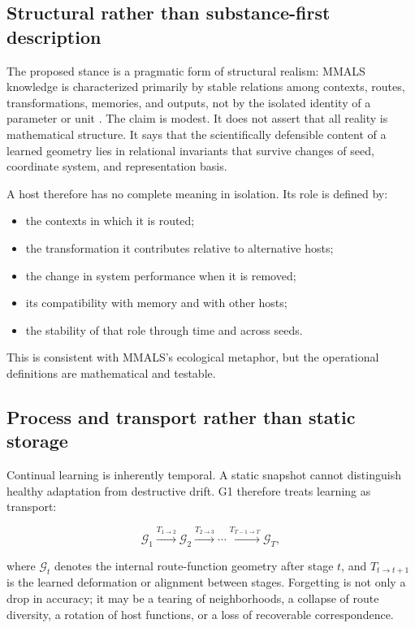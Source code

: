 \documentclass[11pt,a4paper]{article}
\begin{document}
\subsection{Structural rather than substance-first description}

The proposed stance is a pragmatic form of structural realism: MMALS knowledge is characterized primarily by stable relations among contexts, routes, transformations, memories, and outputs, not by the isolated identity of a parameter or unit \citep{worrall1989structural}. The claim is modest. It does not assert that all reality is mathematical structure. It says that the scientifically defensible content of a learned geometry lies in relational invariants that survive changes of seed, coordinate system, and representation basis.

A host therefore has no complete meaning in isolation. Its role is defined by:

\begin{itemize}
\item the contexts in which it is routed;
\item the transformation it contributes relative to alternative hosts;
\item the change in system performance when it is removed;
\item its compatibility with memory and with other hosts;
\item the stability of that role through time and across seeds.
\end{itemize}

This is consistent with MMALS's ecological metaphor, but the operational definitions are mathematical and testable.

\subsection{Process and transport rather than static storage}

Continual learning is inherently temporal. A static snapshot cannot distinguish healthy adaptation from destructive drift. G1 therefore treats learning as transport:

\begin{equation}
\mathcal{G}_1 \xrightarrow{T_{1\rightarrow2}} \mathcal{G}_2 \xrightarrow{T_{2\rightarrow3}} \cdots \xrightarrow{T_{T-1\rightarrow T}} \mathcal{G}_T,
\end{equation}

where \(\mathcal{G}_t\) denotes the internal route-function geometry after stage \(t\), and \(T_{t\rightarrow t+1}\) is the learned deformation or alignment between stages. Forgetting is not only a drop in accuracy; it may be a tearing of neighborhoods, a collapse of route diversity, a rotation of host functions, or a loss of recoverable correspondence.
\end{document}
